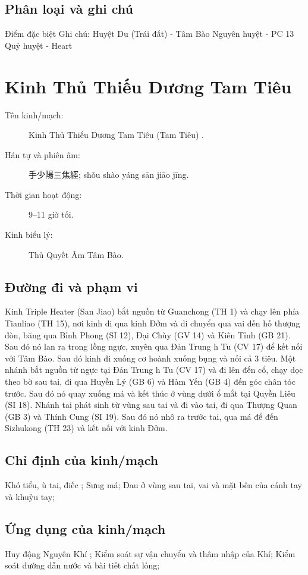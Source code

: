 \documentclass[12pt,a4paper]{article}
\begin{document}
\subsection*{Phân loại và ghi chú}Điểm đặc biệt Ghi chú: Huyệt Du (Trái đất) - Tâm Bào Nguyên huyệt - PC 13 Quỷ huyệt - Heart

\clearpage
\section{Kinh Thủ Thiếu Dương Tam Tiêu}
\begin{description}
\item[Tên kinh/mạch:] Kinh Thủ Thiếu Dương Tam Tiêu (Tam Tiêu) .
\item[Hán tự và phiên âm:] 手少陽三焦經; shǒu shào yáng sān jiāo jīng.
\item[Thời gian hoạt động:] 9--11 giờ tối.
\item[Kinh biểu lý:] Thủ Quyết Âm Tâm Bào.
\end{description}
\subsection*{Đường đi và phạm vi}Kinh Triple Heater (San Jiao) bắt nguồn từ Guanchong (TH 1) và chạy lên phía Tianliao (TH 15), nơi kinh đi qua kinh Đởm và di chuyển qua vai đến hố thượng đòn, băng qua Bỉnh Phong (SI 12), Đại Chùy (GV 14) và Kiên Tỉnh (GB 21). Sau đó nó lan ra trong lồng ngực, xuyên qua Đản Trung h Tu (CV 17) để kết nối với Tâm Bào. Sau đó kinh đi xuống cơ hoành xuống bụng và nối cả 3 tiêu. Một nhánh bắt nguồn từ ngực tại Đản Trung h Tu (CV 17) và đi lên đến cổ, chạy dọc theo bờ sau tai, đi qua Huyền Lý (GB 6) và Hàm Yến (GB 4) đến góc chân tóc trước. Sau đó nó quay xuống má và kết thúc ở vùng dưới ổ mắt tại Quyền Liêu (SI 18). Nhánh tai phát sinh từ vùng sau tai và đi vào tai, đi qua Thượng Quan (GB 3) và Thính Cung (SI 19). Sau đó nó nhô ra trước tai, qua má để đến Sizhukong (TH 23) và kết nối với kinh Đởm.
\subsection*{Chỉ định của kinh/mạch}Khó tiểu, ù tai, điếc ; Sưng má; Đau ở vùng sau tai, vai và mặt bên của cánh tay và khuỷu tay;
\subsection*{Ứng dụng của kinh/mạch}Huy động Nguyên Khí ; Kiểm soát sự vận chuyển và thâm nhập của Khí; Kiểm soát đường dẫn nước và bài tiết chất lỏng;
\end{document}
